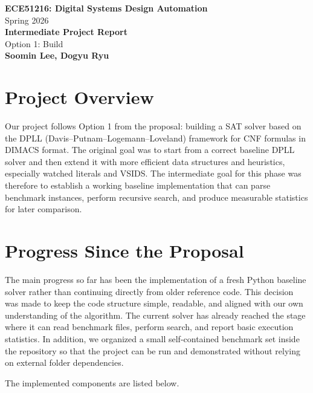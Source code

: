 \documentclass[11pt]{article}
\begin{document}
\begin{center}
    {\Large \textbf{ECE51216: Digital Systems Design Automation}}\\
    {\normalsize Spring 2026}\\[0.4em]
    {\Large \textbf{Intermediate Project Report}}\\[0.3em]
    {\normalsize Option 1: Build}\\[0.6em]
    \textbf{Soomin Lee, Dogyu Ryu}
\end{center}

\section{Project Overview}

Our project follows Option 1 from the proposal: building a SAT solver based on the DPLL
(Davis--Putnam--Logemann--Loveland) framework for CNF formulas in DIMACS format. The
original goal was to start from a correct baseline DPLL solver and then extend it with more
efficient data structures and heuristics, especially watched literals and VSIDS. The intermediate
goal for this phase was therefore to establish a working baseline implementation that can parse
benchmark instances, perform recursive search, and produce measurable statistics for later
comparison.

\section{Progress Since the Proposal}

The main progress so far has been the implementation of a fresh Python baseline solver rather than
continuing directly from older reference code. This decision was made to keep the code structure
simple, readable, and aligned with our own understanding of the algorithm. The current solver has
already reached the stage where it can read benchmark files, perform search, and report basic
execution statistics. In addition, we organized a small self-contained benchmark set inside the
repository so that the project can be run and demonstrated without relying on external folder
dependencies.

The implemented components are listed below.
\end{document}
